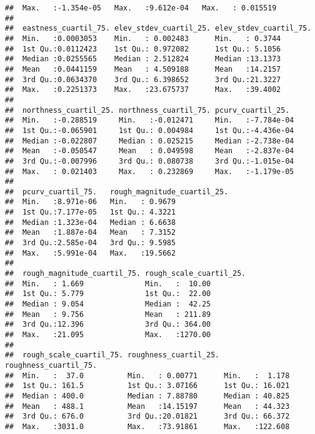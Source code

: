 \documentclass[11pt,]{article}
\begin{document}
\begin{verbatim}
##  Max.   :-1.354e-05   Max.   :9.612e-04   Max.   : 0.015519   
##                                                               
##  eastness_cuartil_75. elev_stdev_cuartil_25. elev_stdev_cuartil_75.
##  Min.   :0.0003053    Min.   : 0.002483      Min.   : 0.3744       
##  1st Qu.:0.0112423    1st Qu.: 0.972082      1st Qu.: 5.1056       
##  Median :0.0255565    Median : 2.512824      Median :13.1373       
##  Mean   :0.0441159    Mean   : 4.509188      Mean   :14.2157       
##  3rd Qu.:0.0634370    3rd Qu.: 6.398652      3rd Qu.:21.3227       
##  Max.   :0.2251373    Max.   :23.675737      Max.   :39.4002       
##                                                                    
##  northness_cuartil_25. northness_cuartil_75. pcurv_cuartil_25.   
##  Min.   :-0.288519     Min.   :-0.012471     Min.   :-7.784e-04  
##  1st Qu.:-0.065901     1st Qu.: 0.004984     1st Qu.:-4.436e-04  
##  Median :-0.022807     Median : 0.025215     Median :-2.738e-04  
##  Mean   :-0.050547     Mean   : 0.049598     Mean   :-2.837e-04  
##  3rd Qu.:-0.007996     3rd Qu.: 0.080738     3rd Qu.:-1.015e-04  
##  Max.   : 0.021403     Max.   : 0.232869     Max.   :-1.179e-05  
##                                                                  
##  pcurv_cuartil_75.   rough_magnitude_cuartil_25.
##  Min.   :8.971e-06   Min.   : 0.9679            
##  1st Qu.:7.177e-05   1st Qu.: 4.3221            
##  Median :1.323e-04   Median : 6.6638            
##  Mean   :1.887e-04   Mean   : 7.3152            
##  3rd Qu.:2.585e-04   3rd Qu.: 9.5985            
##  Max.   :5.991e-04   Max.   :19.5662            
##                                                 
##  rough_magnitude_cuartil_75. rough_scale_cuartil_25.
##  Min.   : 1.669              Min.   :  10.00        
##  1st Qu.: 5.779              1st Qu.:  22.00        
##  Median : 9.054              Median :  42.25        
##  Mean   : 9.756              Mean   : 211.89        
##  3rd Qu.:12.396              3rd Qu.: 364.00        
##  Max.   :21.095              Max.   :1270.00        
##                                                     
##  rough_scale_cuartil_75. roughness_cuartil_25. roughness_cuartil_75.
##  Min.   :  37.0          Min.   : 0.00771      Min.   :  1.178      
##  1st Qu.: 161.5          1st Qu.: 3.07166      1st Qu.: 16.021      
##  Median : 400.0          Median : 7.88780      Median : 40.825      
##  Mean   : 488.1          Mean   :14.15197      Mean   : 44.323      
##  3rd Qu.: 676.0          3rd Qu.:20.01821      3rd Qu.: 66.372      
##  Max.   :3031.0          Max.   :73.91861      Max.   :122.608      

\end{verbatim}
\end{document}

